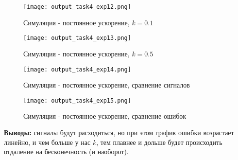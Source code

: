 \newpage
\begin{figure}[ht]
  \centering
  \texttt{[image: output\_task4\_exp12.png]}
\caption{Симуляция - постоянное ускорение, $k=0.1$}
\end{figure}

\begin{figure}[ht]
  \centering
  \texttt{[image: output\_task4\_exp13.png]}
\caption{Симуляция - постоянное ускорение, $k=0.5$}
\end{figure}

\newpage
\begin{figure}[ht]
  \centering
  \texttt{[image: output\_task4\_exp14.png]}
\caption{Симуляция - постоянное ускорение, сравнение сигналов}
\end{figure}

\begin{figure}[ht]
  \centering
  \texttt{[image: output\_task4\_exp15.png]}
\caption{Симуляция - постоянное ускорение, сравнение ошибок}
\end{figure}

\newpage
\textbf{Выводы:} сигналы будут расходиться, но при этом график ошибки возрастает линейно, и чем больше у нас $k$, тем плавнее и дольше будет происходить отдаление на бесконечность (и наоборот).

\endinput